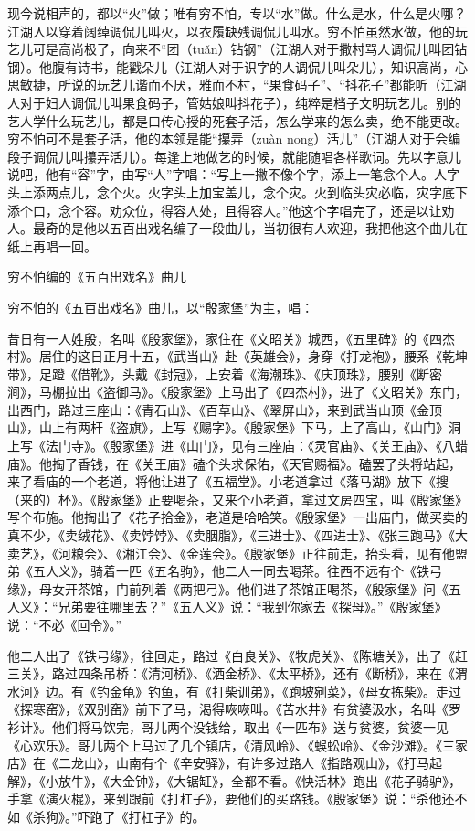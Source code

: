 \documentclass[12pt,UTF8]{ctexbook}
\begin{document}
现今说相声的，都以“火”做；唯有穷不怕，专以“水”做。什么是水，什么是火哪？江湖人以穿着阔绰调侃儿叫火，以衣履缺残调侃儿叫水。穷不怕虽然水做，他的玩艺儿可是高尚极了，向来不“团（tuǎn）钻钢”（江湖人对于撒村骂人调侃儿叫团钻钢）。他腹有诗书，能戳朵儿（江湖人对于识字的人调侃儿叫朵儿），知识高尚，心思敏捷，所说的玩艺儿谐而不厌，雅而不村，“果食码子”、“抖花子”都能听（江湖人对于妇人调侃儿叫果食码子，管姑娘叫抖花子），纯粹是档子文明玩艺儿。别的艺人学什么玩艺儿，都是口传心授的死套子活，怎么学来的怎么卖，绝不能更改。穷不怕可不是套子活，他的本领是能“攥弄（zuàn nong）活儿”（江湖人对于会编段子调侃儿叫攥弄活儿）。每逢上地做艺的时候，就能随唱各样歌词。先以字意儿说吧，他有“容”字，由写“人”字唱：“写上一撇不像个字，添上一笔念个人。人字头上添两点儿，念个火。火字头上加宝盖儿，念个灾。火到临头灾必临，灾字底下添个口，念个容。劝众位，得容人处，且得容人。”他这个字唱完了，还是以让劝人。最奇的是他以五百出戏名编了一段曲儿，当初很有人欢迎，我把他这个曲儿在纸上再唱一回。





穷不怕编的《五百出戏名》曲儿


穷不怕的《五百出戏名》曲儿，以“殷家堡”为主，唱：

昔日有一人姓殷，名叫《殷家堡》，家住在《文昭关》城西，《五里碑》的《四杰村》。居住的这日正月十五，《武当山》赴《英雄会》，身穿《打龙袍》，腰系《乾坤带》，足蹬《借靴》，头戴《封冠》，上安着《海潮珠》、《庆顶珠》，腰别《断密涧》，马棚拉出《盗御马》。《殷家堡》上马出了《四杰村》，进了《文昭关》东门，出西门，路过三座山：《青石山》、《百草山》、《翠屏山》，来到武当山顶《金顶山》，山上有两杆《盗旗》，上写《赐字》。《殷家堡》下马，上了高山，《山门》洞上写《法门寺》。《殷家堡》进《山门》，见有三座庙：《灵官庙》、《关王庙》、《八蜡庙》。他掏了香钱，在《关王庙》磕个头求保佑，《天官赐福》。磕罢了头将站起，来了看庙的一个老道，将他让进了《五福堂》。小老道拿过《落马湖》放下《搜（来的）杯》。《殷家堡》正要喝茶，又来个小老道，拿过文房四宝，叫《殷家堡》写个布施。他掏出了《花子拾金》，老道是哈哈笑。《殷家堡》一出庙门，做买卖的真不少，《卖绒花》、《卖饽饽》、《卖胭脂》，《三进士》、《四进士》、《张三跑马》《大卖艺》，《河粮会》、《湘江会》、《金莲会》。《殷家堡》正往前走，抬头看，见有他盟弟《五人义》，骑着一匹《五名驹》，他二人一同去喝茶。往西不远有个《铁弓缘》，母女开茶馆，门前列着《两把弓》。他们进了茶馆正喝茶，《殷家堡》问《五人义》：“兄弟要往哪里去？”《五人义》说：“我到你家去《探母》。”《殷家堡》说：“不必《回令》。”

他二人出了《铁弓缘》，往回走，路过《白良关》、《牧虎关》、《陈塘关》，出了《赶三关》，路过四条吊桥：《清河桥》、《洒金桥》、《太平桥》，还有《断桥》，来在《渭水河》边。有《钓金龟》钓鱼，有《打柴训弟》，《跑坡剜菜》，《母女拣柴》。走过《探寒窑》，《双别窑》前下了马，渴得咴咴叫。《苦水井》有贫婆汲水，名叫《罗衫计》。他们将马饮完，哥儿两个没钱给，取出《一匹布》送与贫婆，贫婆一见《心欢乐》。哥儿两个上马过了几个镇店，《清风岭》、《蜈蚣岭》、《金沙滩》。《三家店》在《二龙山》，山南有个《辛安驿》，有许多过路人《指路观山》，《打马起解》，《小放牛》，《大金钟》，《大锯缸》，全都不看。《快活林》跑出《花子骑驴》，手拿《演火棍》，来到跟前《打杠子》，要他们的买路钱。《殷家堡》说：“杀他还不如《杀狗》。”吓跑了《打杠子》的。
\end{document}

